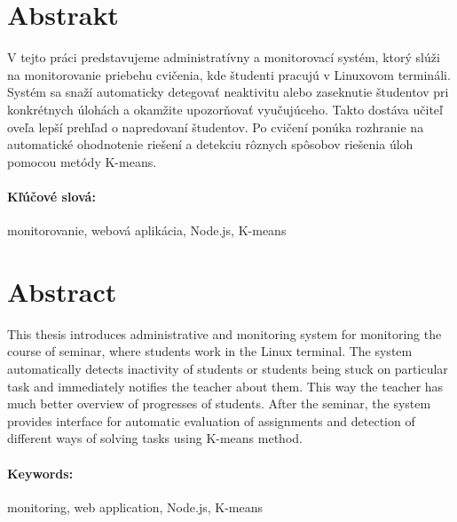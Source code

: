 \documentclass[12pt, oneside]{book}
\theoremstyle{definition}
\begin{document}
\newpage 
\section*{Abstrakt}


V tejto práci predstavujeme administratívny a monitorovací systém, ktorý slúži na
monitorovanie priebehu cvičenia, kde študenti pracujú v Linuxovom termináli.
Systém sa snaží automaticky detegovať neaktivitu alebo zaseknutie študentov
pri konkrétnych úlohách a okamžite upozorňovať vyučujúceho.
Takto dostáva učiteľ oveľa lepší prehľad o napredovaní študentov.
Po cvičení ponúka rozhranie na automatické ohodnotenie riešení a
detekciu rôznych spôsobov riešenia úloh pomocou metódy K-means.

\paragraph*{Kľúčové slová:} monitorovanie, webová aplikácia, Node.js, K-means


\newpage 
\section*{Abstract}

This thesis introduces administrative and monitoring system for monitoring the course of
seminar,
where students work in the Linux terminal. The system automatically detects
inactivity of students or students being stuck on particular task
and immediately notifies the teacher about them.
This way the teacher has much better overview of progresses of students.
After the seminar, the system provides interface for automatic evaluation of
assignments and detection of different ways of solving tasks using K-means method.

\paragraph*{Keywords:} monitoring, web application, Node.js, K-means




\newpage 

\tableofcontents

\end{document}
